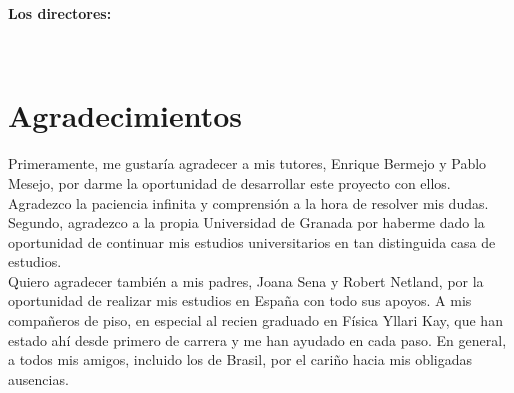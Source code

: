 \textbf{Los directores:}

\vspace{5cm}

\noindent \textbf{\myProf \ \ \ \ \ \myOtherProf}

\chapter*{Agradecimientos}

\thispagestyle{empty}
       \vspace{1cm}


Primeramente, me gustaría agradecer a mis tutores, Enrique Bermejo y Pablo Mesejo,
por darme la oportunidad de desarrollar este proyecto con ellos. 
Agradezco la paciencia infinita y comprensión a la hora de resolver mis dudas. 
Segundo, agradezco a la propia Universidad de Granada por haberme dado la oportunidad 
de continuar mis estudios universitarios en tan distinguida casa de estudios. 
\\

Quiero agradecer también a mis padres, Joana Sena y Robert Netland, por la oportunidad 
de realizar mis estudios en España con todo sus apoyos. A mis compañeros de piso,
en especial al recien graduado en Física Yllari Kay, que han estado ahí desde 
primero de carrera y me han ayudado en cada paso. En general, a todos mis amigos, 
incluido los de Brasil, por el cariño hacia mis obligadas ausencias. 
